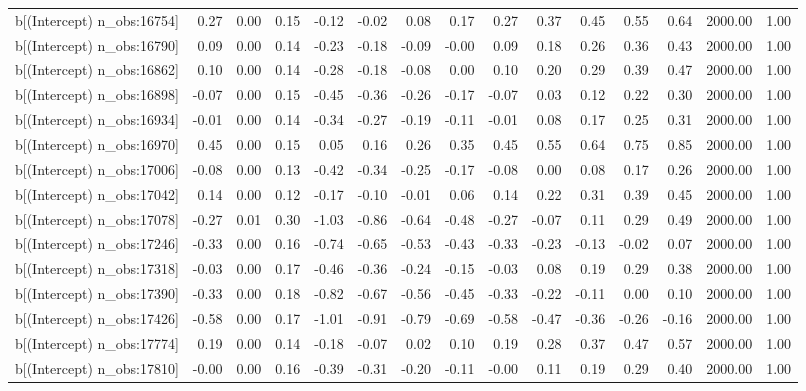 \begin{table}[ht]
\begin{tabular}{rrrrrrrrrrrrrrr}
  b[(Intercept) n\_obs:16754] & 0.27 & 0.00 & 0.15 & -0.12 & -0.02 & 0.08 & 0.17 & 0.27 & 0.37 & 0.45 & 0.55 & 0.64 & 2000.00 & 1.00 \\ 
  b[(Intercept) n\_obs:16790] & 0.09 & 0.00 & 0.14 & -0.23 & -0.18 & -0.09 & -0.00 & 0.09 & 0.18 & 0.26 & 0.36 & 0.43 & 2000.00 & 1.00 \\ 
  b[(Intercept) n\_obs:16862] & 0.10 & 0.00 & 0.14 & -0.28 & -0.18 & -0.08 & 0.00 & 0.10 & 0.20 & 0.29 & 0.39 & 0.47 & 2000.00 & 1.00 \\ 
  b[(Intercept) n\_obs:16898] & -0.07 & 0.00 & 0.15 & -0.45 & -0.36 & -0.26 & -0.17 & -0.07 & 0.03 & 0.12 & 0.22 & 0.30 & 2000.00 & 1.00 \\ 
  b[(Intercept) n\_obs:16934] & -0.01 & 0.00 & 0.14 & -0.34 & -0.27 & -0.19 & -0.11 & -0.01 & 0.08 & 0.17 & 0.25 & 0.31 & 2000.00 & 1.00 \\ 
  b[(Intercept) n\_obs:16970] & 0.45 & 0.00 & 0.15 & 0.05 & 0.16 & 0.26 & 0.35 & 0.45 & 0.55 & 0.64 & 0.75 & 0.85 & 2000.00 & 1.00 \\ 
  b[(Intercept) n\_obs:17006] & -0.08 & 0.00 & 0.13 & -0.42 & -0.34 & -0.25 & -0.17 & -0.08 & 0.00 & 0.08 & 0.17 & 0.26 & 2000.00 & 1.00 \\ 
  b[(Intercept) n\_obs:17042] & 0.14 & 0.00 & 0.12 & -0.17 & -0.10 & -0.01 & 0.06 & 0.14 & 0.22 & 0.31 & 0.39 & 0.45 & 2000.00 & 1.00 \\ 
  b[(Intercept) n\_obs:17078] & -0.27 & 0.01 & 0.30 & -1.03 & -0.86 & -0.64 & -0.48 & -0.27 & -0.07 & 0.11 & 0.29 & 0.49 & 2000.00 & 1.00 \\ 
  b[(Intercept) n\_obs:17246] & -0.33 & 0.00 & 0.16 & -0.74 & -0.65 & -0.53 & -0.43 & -0.33 & -0.23 & -0.13 & -0.02 & 0.07 & 2000.00 & 1.00 \\ 
  b[(Intercept) n\_obs:17318] & -0.03 & 0.00 & 0.17 & -0.46 & -0.36 & -0.24 & -0.15 & -0.03 & 0.08 & 0.19 & 0.29 & 0.38 & 2000.00 & 1.00 \\ 
  b[(Intercept) n\_obs:17390] & -0.33 & 0.00 & 0.18 & -0.82 & -0.67 & -0.56 & -0.45 & -0.33 & -0.22 & -0.11 & 0.00 & 0.10 & 2000.00 & 1.00 \\ 
  b[(Intercept) n\_obs:17426] & -0.58 & 0.00 & 0.17 & -1.01 & -0.91 & -0.79 & -0.69 & -0.58 & -0.47 & -0.36 & -0.26 & -0.16 & 2000.00 & 1.00 \\ 
  b[(Intercept) n\_obs:17774] & 0.19 & 0.00 & 0.14 & -0.18 & -0.07 & 0.02 & 0.10 & 0.19 & 0.28 & 0.37 & 0.47 & 0.57 & 2000.00 & 1.00 \\ 
  b[(Intercept) n\_obs:17810] & -0.00 & 0.00 & 0.16 & -0.39 & -0.31 & -0.20 & -0.11 & -0.00 & 0.11 & 0.19 & 0.29 & 0.40 & 2000.00 & 1.00 \\ 

\end{tabular}
\end{table}
